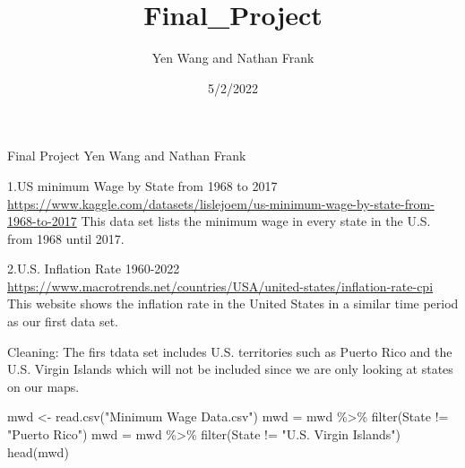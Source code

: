 \documentclass[
]{article}
\title{Final\_Project}
\author{Yen Wang and Nathan Frank}
\date{5/2/2022}
\newenvironment{Shaded}{\begin{snugshade}}{\end{snugshade}}
\newcommand{\FunctionTok}[1]{\textcolor[rgb]{0.00,0.00,0.00}{#1}}
\newcommand{\NormalTok}[1]{#1}
\newcommand{\OtherTok}[1]{\textcolor[rgb]{0.56,0.35,0.01}{#1}}
\newcommand{\SpecialCharTok}[1]{\textcolor[rgb]{0.00,0.00,0.00}{#1}}
\newcommand{\StringTok}[1]{\textcolor[rgb]{0.31,0.60,0.02}{#1}}
\begin{document}
\maketitle

Final Project Yen Wang and Nathan Frank

1.US minimum Wage by State from 1968 to 2017
\url{https://www.kaggle.com/datasets/lislejoem/us-minimum-wage-by-state-from-1968-to-2017}
This data set lists the minimum wage in every state in the U.S. from
1968 until 2017.

2.U.S. Inflation Rate 1960-2022
\url{https://www.macrotrends.net/countries/USA/united-states/inflation-rate-cpi}
This website shows the inflation rate in the United States in a similar
time period as our first data set.

Cleaning: The firs tdata set includes U.S. territories such as Puerto
Rico and the U.S. Virgin Islands which will not be included since we are
only looking at states on our maps.

\begin{Shaded}
\begin{Highlighting}[]
\NormalTok{mwd }\OtherTok{\textless{}{-}} \FunctionTok{read.csv}\NormalTok{(}\StringTok{"Minimum Wage Data.csv"}\NormalTok{)}
\NormalTok{mwd }\OtherTok{=}\NormalTok{ mwd }\SpecialCharTok{\%\textgreater{}\%} \FunctionTok{filter}\NormalTok{(State }\SpecialCharTok{!=} \StringTok{"Puerto Rico"}\NormalTok{)}
\NormalTok{mwd }\OtherTok{=}\NormalTok{ mwd }\SpecialCharTok{\%\textgreater{}\%} \FunctionTok{filter}\NormalTok{(State }\SpecialCharTok{!=} \StringTok{"U.S. Virgin Islands"}\NormalTok{)}
\FunctionTok{head}\NormalTok{(mwd)}
\end{Highlighting}
\end{Shaded}
\end{document}
